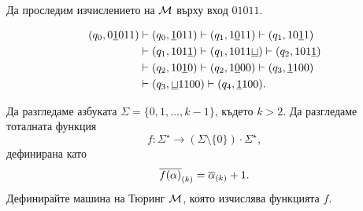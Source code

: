 \begin{example}
Да проследим изчислението на $\mathcal{M}$ върху вход $01011$.

\begin{align*}
  (q_0, 0\underline{1}011) & \vdash (q_0,\underline{1}011) \vdash (q_1, 1\underline{0}11) \vdash (q_1, 10\underline{1}1)\\
                           & \vdash (q_1, 101\underline{1}) \vdash (q_1, 1011\underline{\sqcup}) \vdash (q_2, 101\underline{1})\\
                           & \vdash (q_2, 10\underline{1}0) \vdash (q_2, 1\underline{0}00) \vdash (q_3, \underline{1}100)\\
                           & \vdash (q_3, \underline{\sqcup}1100) \vdash (q_4, \underline{1}100).
\end{align*}
\end{example}


\begin{problem}
  Да разгледаме азбуката $\Sigma = \{0,1,\dots,k-1\}$, където $k > 2$.
  Да разгледаме тоталната функция 
  \[f:\Sigma^\star \to (\Sigma\setminus\{0\})\cdot\Sigma^\star,\]
  дефинирана като
  \[\overline{f(\alpha)}_{(k)} = \overline{\alpha}_{(k)} + 1.\]
  Дефинирайте машина на Тюринг $\mathcal{M}$, която изчислява функцията $f$.
\end{problem}


